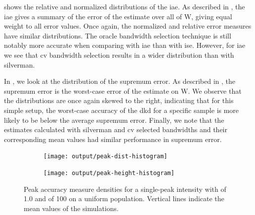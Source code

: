  shows the relative and normalized distributions of the \gls{iae}.
As described in ,
the \gls{iae} gives a summary of the error of the estimate over all of \gls{W},
giving equal weight to all error values.
Once again, the normalized and relative error measures have similar distributions.
The \gls{oracle} bandwidth selection technique is still notably more accurate when comparing with \gls{iae} than with \gls{ise}.
However, for \gls{iae} we see that \gls{cv} bandwidth selection results in a wider distribution than with \gls{silverman}.

In , we look at the distribution of the \gls{supremum error}.
As described in ,
the \gls{supremum error} is the worst-case error of the estimate on \gls{W}.
We observe that the distributions are once again skewed to the right,
indicating that for this simple setup,
the worst-case accuracy of the \gls{dkd} for a specific sample is more likely to be below the average \gls{supremum error}.
Finally, we note that the estimates calculated with \gls{silverman} and \gls{cv}
selected bandwidths and their corresponding mean values had similar performance in \gls{supremum error}.


\begin{figure}[htbp]
    \centering
    \begin{subfigure}[b]{0.45\textwidth}
        \texttt{[image: output/peak-dist-histogram]}
        \label{fig:peaks:unif_100_1.0_1h:dist}
    \end{subfigure}
    \begin{subfigure}[b]{0.45\textwidth}
        \texttt{[image: output/peak-height-histogram]}
        \label{fig:peaks:unif_100_1.0_1h:height}
    \end{subfigure}
    \caption[Peak accuracy: Single-peak of 100 on uniform population]{Peak accuracy measure densities for a single-peak intensity with  of 1.0 and  of 100 on a uniform population. Vertical lines indicate the mean values of the simulations.}
    \label{fig:peaks:unif_100_1.0_1h}
\end{figure}

